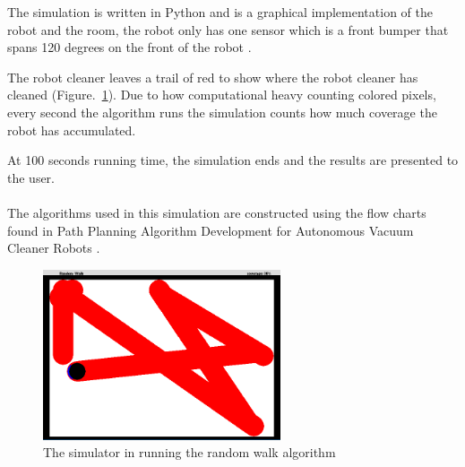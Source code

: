 \documentclass[bachelor]{kththesis}
\begin{document}
The simulation is written in Python and is a graphical implementation of the robot and the room, the
robot only has one sensor which is a front bumper that spans 120 degrees on the front of the robot \parencite{hasan}.

The robot cleaner leaves a trail of red to show where the robot cleaner has cleaned (Figure.~\ref{fig:midrun}).
Due to how computational heavy counting colored pixels, every second the algorithm runs the simulation counts how much coverage the robot has accumulated. 

At 100 seconds running time, the simulation ends and the results are presented to the user. 
\\\\
The algorithms used in this simulation are constructed using the flow charts found in Path Planning Algorithm Development for Autonomous Vacuum Cleaner Robots \parencite{hasan}.

\begin{figure}[H]
	\includegraphics[width=7cm]{img/midrun.png}
	\centering
	\caption{The simulator in running the random walk algorithm}
	\label{fig:midrun}
\end{figure}
\end{document}
